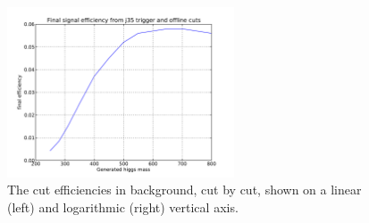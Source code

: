 
\begin{figure}
    \center
	\includegraphics[width=0.6\textwidth]{TriggerCuts/final_efficiency_vs_mass_j35.pdf}	
    \caption{The cut efficiencies in background, cut by cut, shown on a linear (left) and logarithmic (right) vertical axis. \label{fig:final_eff_vs_mass}}
\end{figure}








